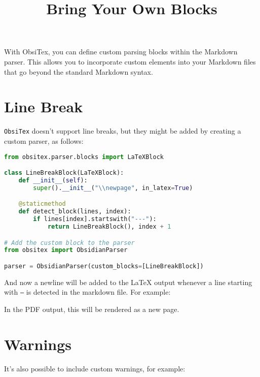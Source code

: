 \documentclass{article}
\begin{document}
\title{
    Bring Your Own Blocks
}
\date{}
\maketitle

With ObsiTex, you can define custom parsing blocks within the Markdown parser. This allows you to incorporate custom elements into your Markdown files that go beyond the standard Markdown syntax.



\section{Line Break}\label{sec:Line_Break}



\texttt{ObsiTex} doesn't support line breaks, but they might be added by creating a custom parser, as follows:



\begin{lstlisting}[language=Python,breaklines=true]
from obsitex.parser.blocks import LaTeXBlock

class LineBreakBlock(LaTeXBlock):
    def __init__(self):
        super().__init__("\\newpage", in_latex=True)

    @staticmethod
    def detect_block(lines, index):
        if lines[index].startswith("---"):
            return LineBreakBlock(), index + 1

# Add the custom block to the parser
from obsitex import ObsidianParser

parser = ObsidianParser(custom_blocks=[LineBreakBlock])
\end{lstlisting}




And now a newline will be added to the LaTeX output whenever a line starting with \texttt{---} is detected in the markdown file. For example:



\newpage

In the PDF output, this will be rendered as a new page.



\section{Warnings}\label{sec:Warnings}



It's also possible to include custom warnings, for example:
\end{document}

